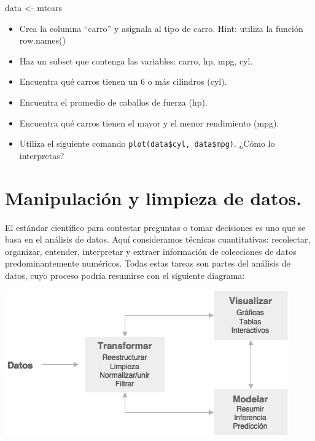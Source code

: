\documentclass[
]{book}
\newenvironment{Shaded}{\begin{snugshade}}{\end{snugshade}}
\newcommand{\NormalTok}[1]{#1}
\newcommand{\OtherTok}[1]{\textcolor[rgb]{0.56,0.35,0.01}{#1}}
\providecommand{\tightlist}{%
  \setlength{\itemsep}{0pt}\setlength{\parskip}{0pt}}
\begin{document}
\begin{Shaded}
\begin{Highlighting}[]
\NormalTok{data }\OtherTok{\textless{}{-}}\NormalTok{ mtcars}
\end{Highlighting}
\end{Shaded}

\begin{itemize}
\tightlist
\item
  Crea la columna ``carro'' y asignala al tipo de carro. Hint: utiliza la función row.names()
\item
  Haz un subset que contenga las variables: carro, hp, mpg, cyl.
\item
  Encuentra qué carros tienen un 6 o más cilindros (cyl).
\item
  Encuentra el promedio de caballos de fuerza (hp).
\item
  Encuentra qué carros tienen el mayor y el menor rendimiento (mpg).
\item
  Utiliza el siguiente comando \texttt{plot(data\$cyl,\ data\$mpg)}. ¿Cómo lo interpretas?
\end{itemize}

\hypertarget{manipulaciuxf3n-y-limpieza-de-datos.}{%
\section{Manipulación y limpieza de datos.}\label{manipulaciuxf3n-y-limpieza-de-datos.}}

El estándar científico para contestar preguntas o tomar decisiones es uno que
se basa en el análisis de datos. Aquí consideramos técnicas cuantitativas:
recolectar, organizar, entender, interpretar y extraer información de
colecciones de datos predominantemente numéricos. Todas estas tareas son partes
del análisis de datos, cuyo proceso podría resumirse con el siguiente diagrama:

\includegraphics{imagenes/analisis.png}
\end{document}
